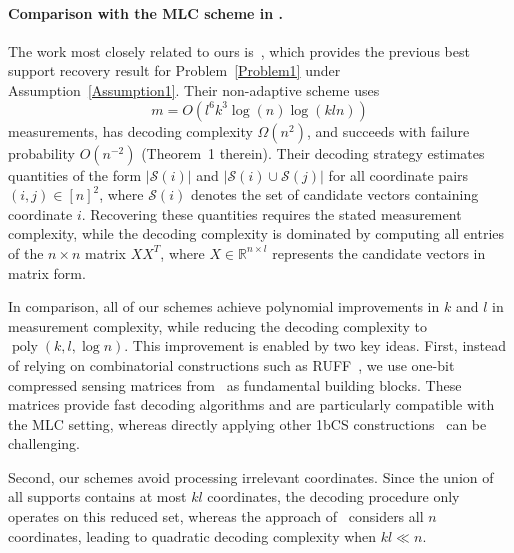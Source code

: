 \documentclass[10pt,a4paper]{amsart}
\newcommand\mc{\mathcal}
\newcommand{\xl}[1]{{\color{blue}#1}}
\begin{document}
\paragraph{Comparison with the MLC scheme in \cite{gandikota2020recovery}.}
The work most closely related to ours is~\cite{gandikota2020recovery}, which provides the previous best support recovery result for Problem~\ref{Problem1} under Assumption~\ref{Assumption1}. Their non-adaptive scheme uses
\[
m=O(l^6k^3\log(n)\log(kln))
\]
measurements, has decoding complexity $\Omega(n^2)$, and succeeds with failure probability $O(n^{-2})$ (Theorem~1 therein). Their decoding strategy estimates quantities of the form $|\mc{S}(i)|$ and $|\mc{S}(i)\cup\mc{S}(j)|$ for all coordinate pairs $(i,j)\in[n]^2$, where $\mc{S}(i)$ denotes the set of candidate vectors containing coordinate $i$. Recovering these quantities requires the stated measurement complexity, while the decoding complexity is dominated by computing all entries of the $n\times n$ matrix $XX^T$, where $X\in\mathbb{R}^{n\times l}$ represents the candidate vectors in matrix form.

In comparison, all of our schemes achieve polynomial improvements in $k$ and $l$ in measurement complexity, while reducing the decoding complexity to $\operatorname{poly}(k,l,\log n)$. This improvement is enabled by two key ideas. First, instead of relying on combinatorial constructions such as RUFF~\cite{acharya2017improved}, we use one-bit compressed sensing matrices from~\cite{li2025support} as fundamental building blocks. These matrices provide fast decoding algorithms and are particularly compatible with the MLC setting, whereas directly applying other 1bCS constructions~\cite{acharya2017improved,matsumoto2023improved,matsumoto2024robust} can be challenging.

Second, our schemes avoid processing irrelevant coordinates. Since the union of all supports contains at most $kl$ coordinates, the decoding procedure only operates on this reduced set, whereas the approach of~\cite{gandikota2020recovery} considers all $n$ coordinates, leading to quadratic decoding complexity when $kl\ll n$.




\end{document}
